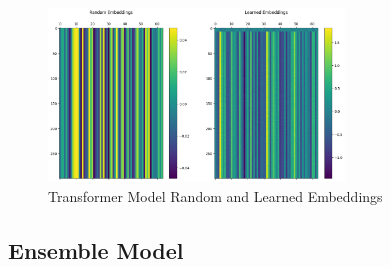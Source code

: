 \pagebreak

\vspace*{-1cm}

\begin{figure}[h!]  
    \centering
    \includegraphics[width=0.7\textwidth]{Images/T EMBED.png}  
    \caption{Transformer Model Random and Learned Embeddings}
    \label{lstm t embed}  %
\end{figure}

\vspace{-1cm}

\subsection{Ensemble Model}

\vspace{-0.5cm}

